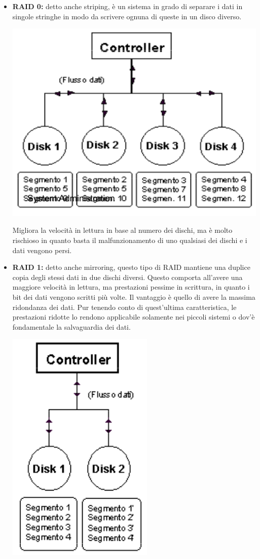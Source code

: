 \documentclass[a4paper]{report}
\begin{document}
\begin{itemize}
\item \textbf{RAID 0:} detto anche striping, è un sistema in grado di separare i dati in singole stringhe in modo da scrivere ognuna di queste in un disco diverso. \begin{center}\includegraphics[scale=0.5]{raid0.png}\end{center}
Migliora la velocità in lettura in base al numero dei dischi, ma è molto rischioso in quanto basta il malfunzionamento di uno qualsiasi dei dischi e i dati vengono persi.

\item \textbf{RAID 1:} detto anche mirroring, questo tipo di RAID mantiene una duplice copia degli stessi dati in due dischi diversi. Questo comporta all'avere una maggiore velocità in lettura, ma prestazioni pessime in scrittura, in quanto i bit dei dati vengono scritti più volte. Il vantaggio è quello di avere la massima ridondanza dei dati.
Pur tenendo conto di quest'ultima caratteristica, le prestazioni ridotte lo rendono applicabile solamente nei piccoli sistemi o dov'è fondamentale la salvaguardia dei dati. \begin{center}
\includegraphics[scale=0.5]{raid1.png}\end{center}


\end{itemize}
\end{document}
